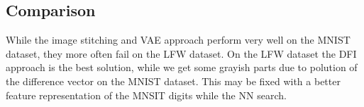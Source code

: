\documentclass[
     11pt,         %
     a4paper,      %
     oneside,
     ]{article}
\begin{document}
\subsection{Comparison}
While the image stitching and VAE approach perform very well on the MNIST dataset, they more often fail on the LFW dataset. On the LFW dataset the DFI approach is the best solution, while we get some grayish parts due to polution of the difference vector on the MNIST dataset. This may be fixed with a better feature representation of the MNSIT digits while the NN search.
\cite{dummyEntry}


\newpage
{}


\end{document}
